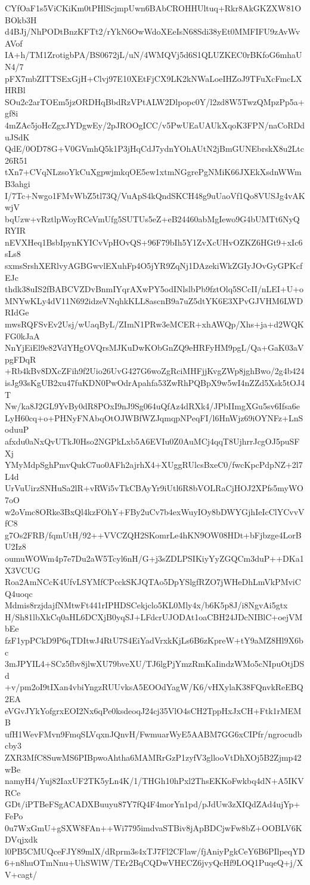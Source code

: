 CYfOaF1s5ViCKiKm0tPHlScjmpUwn6BAbCROHHUltuq+Rkr8AkGKZXW81OBOkb3H
d4BJj/NhPODtBnzKFTt2/rYkN6OwWdoXEeIsN68Sdi38yEt0MMFIFU9zAvWvAVof
IA+h/TM1ZrotigbPA/BS0672jL/uN/4WMQVj5d6S1QLUZKEC0rBKfoG6mhaUN4/7
pFX7mbZITTSExGjH+Clvj97E10XEtFjCX9LK2kNWaLoeIHZoJ9TFuXcFmcLXHRBl
SOu2c2arTOEm5jzORDHqBbdRzVPtALW2Dlpopc0Y/l2zd8W5TwzQMpzPp5a+gf8i
4mZAc5joHcZgxJYDgwEy/2pJROOgICC/v5PwUEaUAUkXqoK3FPN/naCoRDduJSdK
QdE/0OD78G+V0GVmhQ5k1P3jHqCdJ7ydnYOhAUtN2jBmGUNEbrskX8u2Ltc26R51
tXn7+CVqNLzsoYkCuXgpwjmkqOE5ew1xtmNGgrePgNMiK66JXEkXsdnWWmB3ahgi
I/7Tc+Nwgo1FMvWbZ5tl73Q/VuApS4kQndSKCH48g9uUaoVf1Qo8VUSJg4vAKwjV
bqUzw+vRztlpWoyRCeVmUfg5SUTUs5eZ+eB24460abMgIewo9G4bUMTt6NyQRYIR
nEVXHeq1BsbIpynKYICvVpHOvQS+96F79bIh5Y1ZvXcUHvOZKZ6HGt9+xIc6sLs8
sxmsSrshXERlvyAGBGwvlEXuhFp4O5jYR9ZqNj1DAzekiWkZGIyJOvGyGPKcfEJc
thdk38uIS2fBABCVZDvBnmIYqrAXwPY5odINlslbPb9fztOlq5SCcII/nLEI+U+o
MNYwKLy4dV11N692idzeVNqhkKLL8ascnB9a7uZ5dtYK6E3XPvGJVHM6LWDRIdGe
mwsRQFSvEv2Usj/wUaqByL/ZImN1PRw3eMCER+xhAWQp/Xhs+ja+d2WQKFG0kJaA
NnYjEiEl9e82VdYHgOVQrsMJKuDwKObGnZQ9eHRFyHM9pgL/Qa+GaK03aVpgFDqR
+Rb4kBv8DXcZFih9f2Uio26UvG427G6woZgRciMHFjjKvgZWp8jghBwo/2g4b424
isJg93sKgUB2xu47fuKDN0PwOdrApahfa53ZwRhPQBpX9w5wI4nZZd5Xsk5tOJ4T
Nw/ka8J2GL9YvBy0dR8POxI9nJ9Sg064uQfAz4dRXk4/JPbIImgXGu5sv6Ifsa6e
LyH60cq+o+PHNyFNAbqOtOJWBfWZJqmqpNPeqFI/l6HnWjz69iOYNFz+LnSoduuP
afxdu0aNxQvUTkJ0Hso2NGPkLxb5A6EVIu0Z0AuMCj4qqT8UjhrrJcgOJ5puSFXj
YMyMdpSghPmvQukC7uo0AFh2ajrhX4+XUggRUlcsBxeC0/fwcKpcPdpNZ+2l7L4d
UrVuUirzSNHuSa2lR+vRWi5vTkCBAyYr9iUtl6R8bVOLRaCjHOJ2XPfs5myWO7oO
w2oVmc8ORke3BxQl4kzFOhY+FBy2uCv7b4exWuyIOy8bDWYGjhIeIcClYCvvVfC8
g7Os2FRB/fqmUtH/92++VVCZQH2SKomrLe4hKN9OW08HDt+bFjbzge4LorBU2Iz8
oumuWOWm4p7e7Du2aW5Tcyl6nH/G+j3sZDLPSIKiyYyZGQCm3duP++DKa1X3VCUG
Roa2AmNCcK4UfvLSYMfCPcckSKJQTAo5DpYSlgfRZO7jWHeDhLmVkPMviCQ4uoqc
Mdmis8rzjdajfNMtwFt441rIPHDSCekjclo5KL0Mly4x/b6K5p8J/i8NgvAi5gtx
H/Sh81lbXkCq0aHL6DCXjB0yqSJ+LFdcrUJODAt1oaCBH24JDcNIBlC+oejVMbEe
fzF1ypPCkD9P6qTDItwJ4RtU7S4EiYadVrxkKjLs6B6zKpreW+tY9aMZ8Hl9X6bc
3mJPYIL4+SCz5fbv8jlwXU79bveXU/TJ6lgPjYmzRmKaIindzWMo5cNIpuOtjDSd
+v/pm2oI9tIXan4vbiYngzRUUvksA5EOOdYagW/K6/vHXylaK38FQnvkReEBQ2EA
eVGvJYkYofgrxEOI2Nx6qPe0ksdeoqJ24cj35VlO4sCH2TppHxJxCH+Ftk1rMEMB
ufH1WevFMvn9FmqSLVqxnJQnvH/FwmuarWyE5AABM7GG6xCIPfr/ngrocudbcby3
ZXR3MfC8SuwMS6PIBpwoAhtha6MAMRrGzP1zyfV3gllooVtDhXOj5B2Zjmp42wBe
namyH4/Yuj82IaxUF2TK5yLn4K/1/THGh10hPxl2ThsEKKoFwkbq4dN+A5IKVRCe
GDt/iPTBeFSgACADXBuuyu87Y7fQ4F4morYn1pd/pJdUw3zXIQdZAd4ujYp+FePo
0u7WxGmU+gSXW8FAn++Wi7795imdvaSTBiv8jApBDCjwFw8bZ+OOBLV6KDVqjxdk
l0PB5CMUQceFJY89mlX/dRprm3s4xTJ7Fl2CFlaw/fjAniyPgkCeY6B6PIlpeqYD
6+n8huOTmNnu+UhSWlW/TEr2BqCQDwVHECZ6jvyQcHf9LOQ1PuqeQ+j/XV+cagt/
